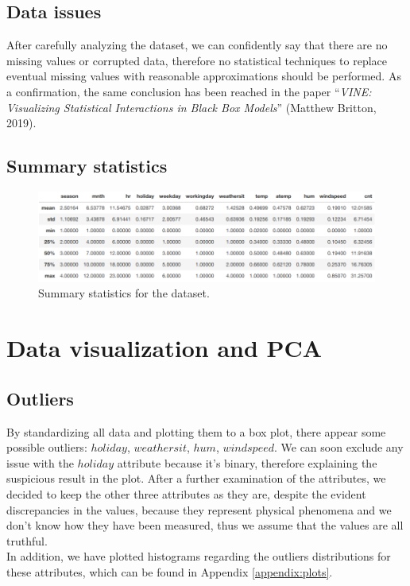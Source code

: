 \documentclass[11pt,a4paper]{article}
\begin{document}
\subsection{Data issues}

After carefully analyzing the dataset, we can confidently say that there are no missing values or corrupted data, therefore no statistical techniques to replace eventual missing values with reasonable approximations should be performed. As a confirmation, the same conclusion has been reached in the paper “\textit{VINE: Visualizing Statistical Interactions in Black Box Models}” (Matthew Britton, 2019).

\subsection{Summary statistics}


\begin{figure}[H]
    \centering
    \includegraphics[width=\textwidth]{res/statistics_summary.png}
    \caption{Summary statistics for the dataset.}
    \label{fig:summary}
\end{figure}



\section{Data visualization and PCA}

\subsection{Outliers}


By standardizing all data and plotting them to a box plot, there appear some possible outliers: $holiday$, $weathersit$, $hum$, $windspeed$.
We can soon exclude any issue with the $holiday$ attribute because it's binary, therefore explaining the suspicious result in the plot. After a further examination of the attributes, we decided to keep the other three attributes as they are, despite the evident discrepancies in the values, because they represent physical phenomena and we don't know how they have been measured, thus we assume that the values are all truthful. \\
In addition, we have plotted histograms regarding the outliers distributions for these attributes, which can be found in Appendix \ref{appendix:plots}.
\end{document}
